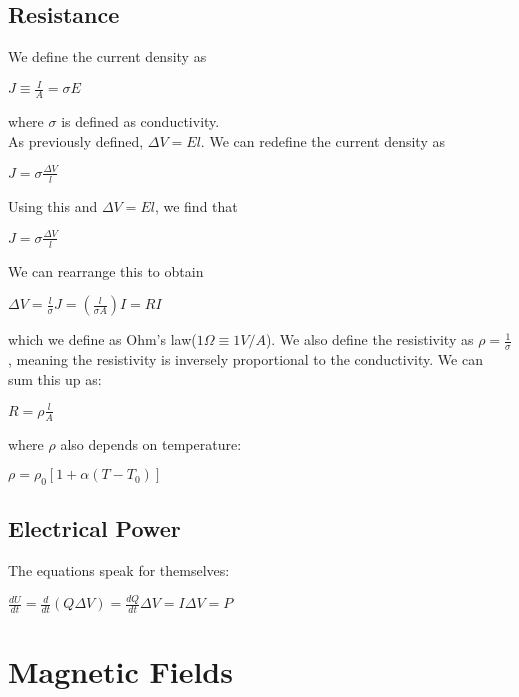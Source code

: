 \documentclass{report}
\begin{document}
	\section{Resistance}
		We define the current density as\\
		\centerline{$J \equiv \frac{I}{A} = \sigma E$}
		where $\sigma$ is defined as conductivity.\\
		As previously defined, $\Delta V = El$. We can redefine the current density as \\
		\centerline{$J = \sigma \frac{\Delta V}{l}$}
		Using this and $\Delta V = El$, we find that \\
		\centerline{$J = \sigma \frac{\Delta V}{l}$}
		We can rearrange this to obtain \\
		\centerline{$\Delta V = \frac{l}{\sigma} J = (\frac{l}{\sigma A}) I = RI$}
		which we define as Ohm's law($1 \Omega \equiv 1 V/A$).
		We also define the resistivity as $\rho = \frac{1}{\sigma}$, meaning the resistivity is inversely proportional to the conductivity. We can sum this up as:\\
		\centerline{$R = \rho \frac{l}{A}$}
		where $\rho$ also depends on temperature:\\
		\centerline{$\rho = \rho_0 [1 + \alpha(T - T_0)]$} 
	\section{Electrical Power}
		The equations speak for themselves:\\
		\centerline{$\frac{dU}{dt} = \frac{d}{dt}(Q\Delta V) = \frac{dQ}{dt}\Delta V = I\Delta V = P$}
\chapter{Magnetic Fields}
\end{document}
